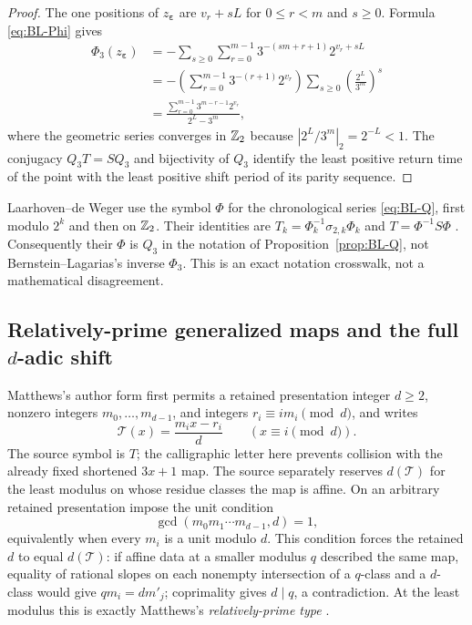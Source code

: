 \begin{proof}
The one positions of $z_{\boldsymbol\varepsilon}$ are
$v_r+sL$ for $0\leq r<m$ and $s\geq0$.  Formula \eqref{eq:BL-Phi} gives
\begin{align*}
 \Phi_3(z_{\boldsymbol\varepsilon})
 &=-\sum_{s\geq0}\sum_{r=0}^{m-1}
       3^{-(sm+r+1)}2^{v_r+sL}\\
 &=-\left(\sum_{r=0}^{m-1}3^{-(r+1)}2^{v_r}\right)
       \sum_{s\geq0}\left(\frac{2^L}{3^m}\right)^s\\
 &=\frac{\displaystyle\sum_{r=0}^{m-1}3^{m-r-1}2^{v_r}}
        {2^L-3^m},
\end{align*}
where the geometric series converges in $\mathbb{Z}_{2}$ because
$|2^L/3^m|_2=2^{-L}<1$.  The conjugacy
$Q_3T=SQ_3$ and bijectivity of $Q_3$ identify the least positive return time
of the point with the least positive shift period of its parity sequence.
\end{proof}

Laarhoven--de Weger use the symbol $\Phi$ for the chronological series
\eqref{eq:BL-Q}, first modulo $2^k$ and then on $\mathbb{Z}_{2}$.  Their identities are
$T_k=\Phi_k^{-1}\sigma_{2,k}\Phi_k$ and
$T=\Phi^{-1}S\Phi$ \cite[Secs.~2--3]{LaarhovenDeWeger2012}.
Consequently their $\Phi$ is $Q_3$ in the notation of
Proposition~\ref{prop:BL-Q}, not Bernstein--Lagarias's inverse $\Phi_3$.
This is an exact notation crosswalk, not a mathematical disagreement.




\subsection{Relatively-prime generalized maps and the full
\texorpdfstring{$d$}{d}-adic shift}

Matthews's author form first permits a retained presentation integer
$d\geq2$, nonzero integers
$m_0,\ldots,m_{d-1}$, and integers $r_i\equiv i m_i\pmod d$, and writes
\begin{equation}
\label{eq:Matthews-general-map}
 \mathcal T(x)=\frac{m_i x-r_i}{d}
 \qquad(x\equiv i\pmod d).
\end{equation}
The source symbol is $T$; the calligraphic letter here prevents collision with
the already fixed shortened $3x+1$ map.  The source separately reserves
$d(\mathcal T)$ for the least modulus on whose residue classes the map is
affine.  On an arbitrary retained presentation impose the unit condition
\begin{equation}
\label{eq:Matthews-unit-gate}
 \gcd(m_0m_1\cdots m_{d-1},d)=1,
\end{equation}
equivalently when every $m_i$ is a unit modulo $d$.  This condition forces the
retained $d$ to equal $d(\mathcal T)$: if affine data at a smaller modulus $q$
described the same map, equality of rational slopes on each nonempty
intersection of a $q$-class and a $d$-class would give
$q m_i=d m'_j$; coprimality gives $d\mid q$, a contradiction.  At the least
modulus this is exactly Matthews's \emph{relatively-prime type}
\cite[author-form pp.~2--3]{Matthews2010AuthorForm}.

